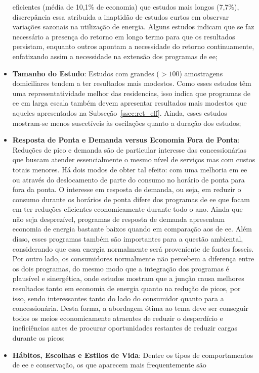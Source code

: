 \begin{itemize}
eficientes (média de 10,1\% de economia) que estudos mais longos (7,7\%),
discrepância essa atribuída a inaptidão de estudos curtos em observar variações
sazonais na utilização de energia. Alguns estudos indicam que se faz necessário
a presença do retorno em longo termo para que os resultados persistam,
enquanto outros apontam a necessidade do retorno continuamente, enfatizando
assim a necessidade na extensão dos programas de \gls{ee};
\item \textbf{Tamanho do Estudo}: Estudos com grandes ($> 100$) amostragens
domiciliares tendem a ter resultados mais modestos. Como esses estudos têm uma
representatividade melhor das residencias, isso indica que programas de
\gls{ee} em larga escala também devem apresentar resultados mais modestos que
aqueles apresentados na Subseção~\ref{ssec:ret_eff}.
Ainda, esses estudos mostram-se menos suscetíveis às oscilações
quanto a duração dos estudos;
\item \textbf{Resposta de Ponta e Demanda versus Economia Fora de
Ponta}: Reduções de pico e demanda são de particular interesse das
concessionárias que buscam atender essencialmente o mesmo nível de
serviços mas com custos totais menores. Há dois modos de obter tal
efeito: com uma melhoria em \gls{ee} ou através do deslocamento de
parte do consumo no horário de ponta para fora da ponta. O interesse
em resposta de demanda, ou seja, em reduzir o consumo durante os
horários de ponta difere dos programas de \gls{ee} que focam em ter
reduções eficientes economicamente durante todo o ano. Ainda que não
seja desprezível, programas de resposta de demanda apresentam economia
de energia bastante baixos quando em comparação aos de \gls{ee}. Além
disso, esses programas também são importantes para a questão
ambiental, considerando que essa energia normalmente será proveniente
de fontes fosseis. Por outro lado, os consumidores normalmente não
percebem a diferença entre os dois programas, do mesmo modo que a
integração dos programas é plausível e sinergética, onde estudos
mostram que a junção causa melhores resultados tanto em economia de
energia quanto na redução de picos, por isso, sendo interessantes
tanto do lado do consumidor quanto para a concessionária. Desta forma,
a abordagem ótima ao tema deve ser conseguir todos os meios
economicamente atraentes de reduzir o desperdício e ineficiências
antes de procurar oportunidades restantes de reduzir cargas durante os
picos;
\item \textbf{Hábitos, Escolhas e Estilos de Vida}: Dentre os tipos de
comportamentos de \gls{ee} e conservação, os que aparecem mais frequentemente são

\end{itemize}
